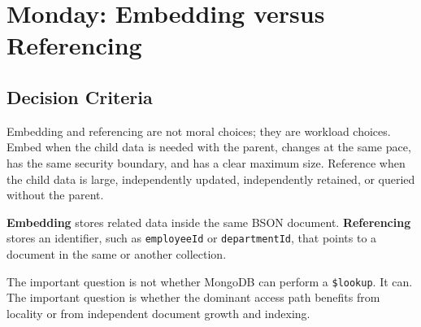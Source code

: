 \section{Monday: Embedding versus Referencing}
\subsection{Decision Criteria}
Embedding and referencing are not moral choices; they are workload choices. Embed when the child data is needed with the parent, changes at the same pace, has the same security boundary, and has a clear maximum size. Reference when the child data is large, independently updated, independently retained, or queried without the parent.

\begin{definitionbox}
\textbf{Embedding} stores related data inside the same BSON document. \textbf{Referencing} stores an identifier, such as \texttt{employeeId} or \texttt{departmentId}, that points to a document in the same or another collection.
\end{definitionbox}

\begin{notebox}
The important question is not whether MongoDB can perform a \texttt{\$lookup}. It can. The important question is whether the dominant access path benefits from locality or from independent document growth and indexing.
\end{notebox}

